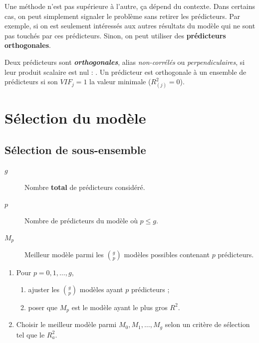 \documentclass[french]{article}
\begin{document}
\begin{multicols*}{2}
Une méthode n'est pas supérieure à l'autre, ça dépend du contexte. Dans certains cas, on peut simplement signaler le problème sans retirer les prédicteurs. Par exemple, si on est seulement intéressés aux autres résultats du modèle qui ne sont pas touchés par ces prédicteurs. Sinon, on peut utiliser des \textbf{prédicteurs orthogonales}.

\bigskip

Deux prédicteurs sont \textbf{\textit{orthogonales}}, alias \textit{non-corrélés} ou \textit{perpendiculaires}, si leur produit scalaire est nul : . Un prédicteur est orthogonale à un ensemble de prédicteurs si son $VIF_{j} =  1$ la valeur minimale ($R^{2}_{(j)} = 0$).




\newpage
\section{Sélection du modèle}\label{sec:modelSelection}
\subsection{Sélection de sous-ensemble}\label{subsec:modSelSub}
\begin{distributions}[Notation]
\begin{description}
	\item[$g$]	Nombre \textbf{total} de prédicteurs considéré.
	\item[$p$]	Nombre de prédicteurs du modèle où $p \leq g$.
	\item[$M_{p}$]	Meilleur modèle parmi les $\binom{g}{p}$ modèles possibles contenant $p$ prédicteurs.
\end{description}
\end{distributions}

\begin{algo2}
\begin{enumerate}[label = \circled{\arabic*}{trueblue}]
	\item	Pour $p = 0, 1, \dots, g$, 
		\begin{enumerate}[label = \circled{\scriptsize{(\alph*)}}{trueblue!80!white}]
			\item	ajuster les $\binom{g}{p}$ modèles ayant $p$ prédicteurs ;
			\item	poser que $M_{p}$ est le modèle ayant le plus gros $R^{2}$.
		\end{enumerate}
	\item	Choisir le meilleur modèle parmi $M_{0}, M_{1}, \dots, M_{g}$ selon un critère de sélection tel que le $R^{2}_{a}$.
\end{enumerate}

\end{algo2}
\end{multicols*}
\end{document}
